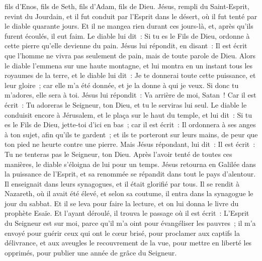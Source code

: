\begin{multicols}{2}
fils d'Enos, fils de Seth, fils d'Adam, fils de Dieu.
\VerseOne{}Jésus, rempli du Saint-Esprit, revint du Jourdain, et il fut conduit par l'Esprit dans le désert,
où il fut tenté par le diable quarante jours. Et il ne mangea rien durant ces jours-là, et, après qu'ils furent écoulés, il eut faim.
Le diable lui dit~: Si tu es le Fils de Dieu, ordonne à cette pierre qu'elle devienne du pain.
Jésus lui répondit, en disant~: Il est écrit que l'homme ne vivra pas seulement de pain, mais de toute parole de Dieu.
Alors le diable l'emmena sur une haute montagne, et lui montra en un instant tous les royaumes de la terre,
et le diable lui dit~: Je te donnerai toute cette puissance, et leur gloire~; car elle m'a été donnée, et je la donne à qui je veux.
Si donc tu m'adores, elle sera à toi.
Jésus lui répondit~: Va arrière de moi, Satan~! Car il est écrit~: Tu adoreras le Seigneur, ton Dieu, et tu le serviras lui seul.
Le diable le conduisit encore à Jérusalem, et le plaça sur le haut du temple, et lui dit~: Si tu es le Fils de Dieu, jette-toi d'ici en bas~;
car il est écrit~: Il ordonnera à ses anges à ton sujet, afin qu'ils te gardent~;
et ils te porteront sur leurs mains, de peur que ton pied ne heurte contre une pierre.
Mais Jésus répondant, lui dit~: Il est écrit~: Tu ne tenteras pas le Seigneur, ton Dieu.
Après l'avoir tenté de toutes ces manières, le diable s'éloigna de lui pour un temps.
Jésus retourna en Galilée dans la puissance de l'Esprit, et sa renommée se répandit dans tout le pays d'alentour.
Il enseignait dans leurs synagogues, et il était glorifié par tous.
Il se rendit à Nazareth, où il avait été élevé, et selon sa coutume, il entra dans la synagogue le jour du sabbat. Et il se leva pour faire la lecture,
et on lui donna le livre du prophète Esaïe. Et l'ayant déroulé, il trouva le passage où il est écrit~:
L'Esprit du Seigneur est sur moi, parce qu'il m'a oint pour évangéliser les pauvres~; il m'a envoyé pour guérir ceux qui ont le cœur brisé,
pour proclamer aux captifs la délivrance, et aux aveugles le recouvrement de la vue, pour mettre en liberté les opprimés, pour publier une année de grâce du Seigneur.

\end{multicols}
